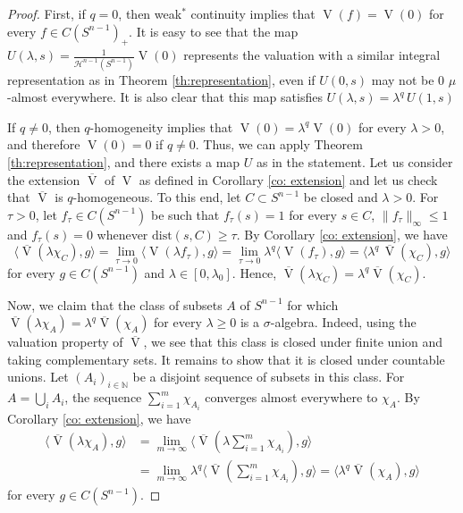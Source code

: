 \documentclass[11pt, a4paper]{amsart}
\newcommand{\dist}{\mbox{dist}}
\newcommand{\sn}{{S^{n-1}}}
\newcommand{\oV}{\operatorname{V}}
\newcommand{\cfn}{C(\sn )_{\scriptscriptstyle +}}
\begin{document}
\begin{proof}
First, if $q=0$, then weak$^*$ continuity implies that $\oV(f)=\oV(0)$ for every $f\in\cfn$. It is easy to see that the map $U(\lambda,s)=\frac{1}{\mathcal{H}^{n-1}(\sn)}\oV(0)$ represents the valuation with a similar integral representation as in Theorem \ref{th:representation}, even if $U(0,s)$ may not be 0 $\mu$-almost everywhere. It is also clear that this map satisfies $U(\lambda,s)=\lambda^q\,U(1,s)$ 




If $q\neq 0$, then $q$-homogeneity implies that $\oV(0)=\lambda^q\oV(0)$ for every $\lambda>0$, and therefore $\oV(0)=0$ if $q\neq 0$. Thus, we can apply Theorem \ref{th:representation}, and there exists a map $U$ as in the statement. Let us consider the extension $\overline{\oV}$ of $\oV$  as defined in Corollary \ref{co: extension} and let us check that $\overline{\oV}$ is $q$-homogeneous. To this end, let $C \subset \sn $ be closed and $\lambda>0$. For $\tau>0$, let $f_\tau\in C(\sn )$ be such that $f_\tau(s)=1$ for every $s\in C$, $\|f_\tau\|_{\scriptscriptstyle \infty}\leq 1$ and $f_\tau(s)= 0$ whenever $\dist(s, C)\geq \tau$. By Corollary \ref{co: extension}, we have  $$\langle \overline{\oV}(\lambda\chi_C),g\rangle= \lim_{\tau\rightarrow 0} \langle \oV(\lambda f_\tau),g\rangle = 
\lim_{\tau\rightarrow 0} \lambda^q \langle \oV( f_\tau),g\rangle = \langle \lambda^q\, \overline{\oV}(\chi_C),g\rangle$$
for every $g\in C(\sn )$ and $\lambda\in [0,\lambda_0]$. Hence, $\overline{\oV}(\lambda\chi_C)=\lambda^q\overline{\oV}(\chi_C)$.

Now, we claim that the class of subsets $A$ of $\sn $  for which $\overline{\oV}(\lambda \chi_A) = \lambda^q\overline{\oV}(\chi_A)$ for every $\lambda \ge 0$ is a $\sigma$-algebra. Indeed, using the valuation property of $\overline{\oV}$,  we see that this class is closed under finite union and taking complementary sets. 
It remains to show that it is closed under countable unions. Let $(A_i)_{i\in \mathbb N}$  be a disjoint sequence of subsets in this class. For $A=\bigcup_i A_i$, the
 sequence $\sum_{i=1}^m \chi_{A_i}$ converges almost everywhere to $\chi_A$. By Corollary \ref{co: extension}, we have 
\begin{align}
\langle \overline{\oV}(\lambda\chi_A),g\rangle &= \lim_{m\to\infty} \langle \overline{\oV}(\lambda \sum\nolimits_{i=1}^m \chi_{A_i}),g\rangle\\
&= \lim_{m\to\infty} \lambda^q \langle\overline{\oV}( \sum\nolimits_{i=1}^m \chi_{A_i}) ,g\rangle 
= \langle \lambda^q \overline{\oV}(\chi_A),g\rangle
\end{align}
for every $g\in C(\sn )$.
\goodbreak


\end{proof}
\end{document}
